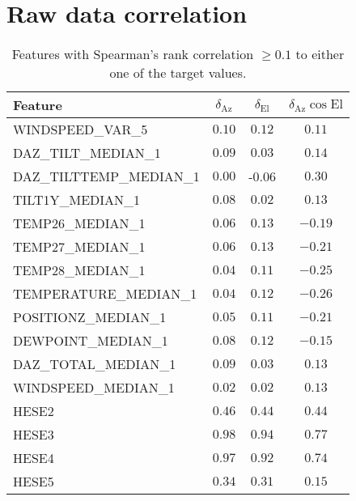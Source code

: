 \section{Raw data correlation}
\begin{table}[h]
    \centering %
    \caption{Features with Spearman's rank correlation $\geq 0.1$ to either one of the target values.}
    \begin{tabular}{lccc}
        \toprule
        Feature &  $\delta_{\text{Az}}$ &  $\delta_{\text{El}}$ &  $\delta_{\text{Az}}\cos{\text{El}}$ \\
        \midrule
        WINDSPEED\_VAR\_5        &      $0.10$ &      $0.12$ &               $0.11$ \\
        DAZ\_TILT\_MEDIAN\_1      &      $0.09$ &      $0.03$ &               $0.14$ \\
        DAZ\_TILTTEMP\_MEDIAN\_1  &      $0.00$ &     -$0.06$ &               $0.30$ \\
        TILT1Y\_MEDIAN\_1        &      $0.08$ &      $0.02$ &               $0.13$ \\
        TEMP26\_MEDIAN\_1        &      $0.06$ &      $0.13$ &              $-0.19$ \\
        TEMP27\_MEDIAN\_1        &      $0.06$ &      $0.13$ &              $-0.21$ \\
        TEMP28\_MEDIAN\_1        &      $0.04$ &      $0.11$ &              $-0.25$ \\
        TEMPERATURE\_MEDIAN\_1   &      $0.04$ &      $0.12$ &              $-0.26$ \\
        POSITIONZ\_MEDIAN\_1     &      $0.05$ &      $0.11$ &              $-0.21$ \\
        DEWPOINT\_MEDIAN\_1      &      $0.08$ &      $0.12$ &              $-0.15$ \\
        DAZ\_TOTAL\_MEDIAN\_1     &      $0.09$ &      $0.03$ &               $0.13$ \\
        WINDSPEED\_MEDIAN\_1     &      $0.02$ &      $0.02$ &               $0.13$ \\
        HESE2                  &      $0.46$ &      $0.44$ &               $0.44$ \\
        HESE3                  &      $0.98$ &      $0.94$ &               $0.77$ \\
        HESE4                  &      $0.97$ &      $0.92$ &               $0.74$ \\
        HESE5                  &      $0.34$ &      $0.31$ &               $0.15$ \\

\end{tabular}
\end{table}
